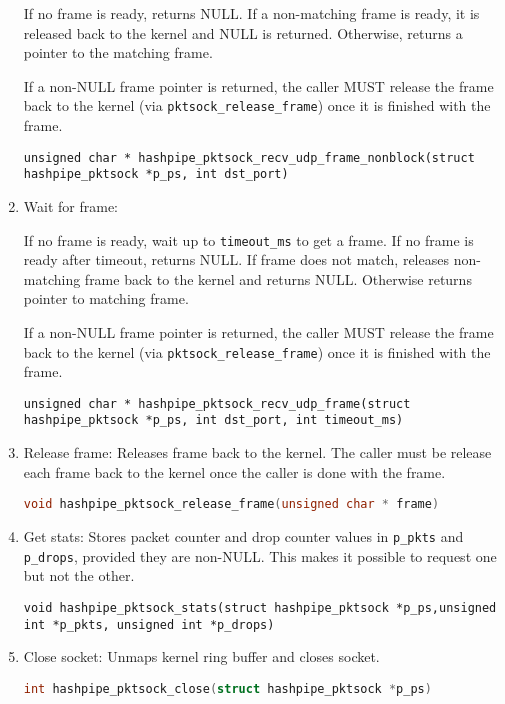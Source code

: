 \documentclass[12pt]{article}
\def\clst{\lstinline[basicstyle=\ttfamily,breaklines=true,language=C]}
\begin{document}
\begin{enumerate}
If no frame is ready, returns NULL.  If a non-matching frame is ready, it is
released back to the kernel and NULL is returned.  Otherwise, returns a
pointer to the matching frame.

If a non-NULL frame pointer is returned, the caller MUST release the frame
back to the kernel (via {\tt pktsock\_release\_frame}) once it is finished with
the frame.

\begin{lstlisting}
unsigned char * hashpipe_pktsock_recv_udp_frame_nonblock(struct hashpipe_pktsock *p_ps, int dst_port)
\end{lstlisting}

\item Wait for frame:

If no frame is ready, wait up to {\tt timeout\_ms} to get a frame.  If no frame
is ready after timeout, returns NULL.  If frame does not match, releases
non-matching frame back to the kernel and returns NULL.  Otherwise returns
pointer to matching frame.

If a non-NULL frame pointer is returned, the caller MUST release the frame
back to the kernel (via {\tt pktsock\_release\_frame}) once it is finished with
the frame.

\begin{lstlisting}
unsigned char * hashpipe_pktsock_recv_udp_frame(struct hashpipe_pktsock *p_ps, int dst_port, int timeout_ms)
\end{lstlisting}

\item Release frame:
Releases frame back to the kernel.  The caller must be release each frame
back to the kernel once the caller is done with the frame.

\clst{void hashpipe_pktsock_release_frame(unsigned char * frame)}

\item Get stats:
Stores packet counter and drop counter values in {\tt *p\_pkts} and 
{\tt *p\_drops}, provided they are non-NULL.  This makes it possible to 
request one but not the other.

\begin{lstlisting}
void hashpipe_pktsock_stats(struct hashpipe_pktsock *p_ps,unsigned int *p_pkts, unsigned int *p_drops)
\end{lstlisting}

\item Close socket:
Unmaps kernel ring buffer and closes socket.

\clst{int hashpipe_pktsock_close(struct hashpipe_pktsock *p_ps)}

\end{enumerate}
\end{document}

